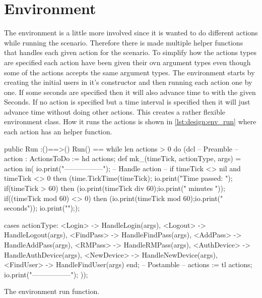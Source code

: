 \section{Environment}

The environment is a little more involved since it is wanted to do different actions while running  the scenario. Therefore there is made multiple helper functions that handles each given action for the scenario. To simplify how the actions types are specified each action have been given their ovn argument types even though some of the actions accepts the same argument types. The environment starts by creating the initial users in it's constructor and then running each action one by one. If some seconds are specified then it will also advance time to with the given Seconds. If no action is specified but a time interval is specified then it will just advance time without doing other actions. This creates a rather flexible environment class. How it runs the actions is shown in \cref{lst:design:env_run} where each action has an helper function.
\begin{listing}[H]
    \begin{vdm_al}
 public Run :()==>()
        Run() == 
            while len actions > 0 do
                (dcl
                    -- Preamble --
                    action : ActionsToDo := hd actions;
                    def mk_(timeTick, actionType, args) = action in(
                    io.print("\n-----------------\n");
                    -- Handle action --
                    if timeTick <> nil and timeTick <> 0 then
                        (time.TickTime(timeTick);
                        io.print("Time passed: ");
                        if(timeTick > 60) then
                            (io.print(timeTick div 60);io.print(" minutes "));
                        if((timeTick mod 60) <> 0) then
                            (io.print(timeTick mod 60);io.print(" seconds"));
                            io.print("\n"););
                        
                    cases actionType:
                    <Login> -> HandleLogin(args),
                    <Logout> -> HandleLogout(args),
                    <FindPass> -> HandleFindPass(args),
                    <AddPass> -> HandleAddPass(args),
                    <RMPass> -> HandleRMPass(args),
                    <AuthDevice> -> HandleAuthDevice(args),
                    <NewDevice> -> HandleNewDevice(args),
                    <FindUser> -> HandleFindUser(args)
                    end;
                    -- Postamble --
                    actions := tl actions;
                    io.print("-----------------\n");
                ));
    

    \end{vdm_al}
    \caption{The environment run function.}
    \label{lst:design:env_run}
\end{listing}

